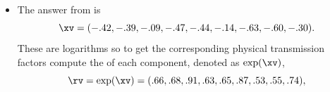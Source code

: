 \begin{example}
%

\def\temp#1#2#3#4#5#6#7#8#9{\begin{tikzpicture}
\begin{axis}[tiny,axis equal image,colormap/blackwhite,axis lines=none]
\addplot[patch,patch type=rectangle
,point meta min={0},point meta max={1}
,table/row sep=\\,patch table with point meta={%
8 9 13 12   #1\\
4 5 9 8     #2\\
0 1 5 4     #3\\
9 10 14 13  #4\\
5 6 10 9    #5\\
1 2 6 5     #6\\
10 11 15 14 #7\\
6 7 11 10   #8\\
2 3 7 6     #9\\
}]
table[row sep=\\] {
x y \\
0 0\\%
1 0\\%
2 0\\%
3 0\\%
0 1\\%
1 1\\%
2 1\\%
3 1\\%
0 2\\%
1 2\\%
2 2\\%
3 2\\%
0 3\\%
1 3\\%
2 3\\%
3 3\\%
};
\end{axis}
\end{tikzpicture}}%
\begin{itemize}
\item 
The answer from \script[2] is \twodp
\begin{equation*}
\xv=
(-.42,-.39,-.09,-.47,-.44,-.14,-.63,-.60,-.30).
\end{equation*}
These are logarithms so to get the corresponding physical transmission factors compute the  of each component, denoted as \(\exp(\xv)\),
\begin{equation*}
\rv=\exp(\xv)=(.66,.68,.91,.63,.65,.87,.53,.55,.74),
\end{equation*}

\end{itemize}
\end{example}
